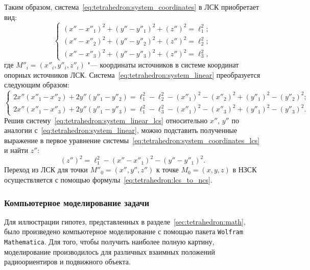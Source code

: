 \documentclass[../main.tex]{subfiles}
\begin{document}
Таким образом, система~\eqref{eq:tetrahedron:system_coordinates} в ЛСК приобретает вид:
\begin{equation}\label{eq:tetrahedron:system_coordinates_lcs}
  \begin{cases}
    \left(x'' - x''_1\right)^2 + \left(y'' - y''_1\right)^2 + \left(z''\right)^2 = \ell_1^2; \\
    \left(x'' - x''_2\right)^2 + \left(y'' - y''_2\right)^2 + \left(z''\right)^2 = \ell_2^2; \\
    \left(x'' - x''_3\right)^2 + \left(y'' - y''_3\right)^2 + \left(z''\right)^2 = \ell_3^2,
  \end{cases}
\end{equation}
где $M''_i = \left(x''_i, y''_i, z''_i\right)$ "--- координаты источников в системе координат опорных источников ЛСК. Система~\eqref{eq:tetrahedron:system_linear} преобразуется следующим образом:
\begin{equation}\label{eq:tetrahedron:system_linear_lcs}
  \begin{cases}
    2 x'' \left(x''_1 - x''_2\right) + 2 y'' \left(y''_1 - y''_2\right) = \ell_1^2 - \ell_2^2 - \left(x''_1\right)^2 - \left(x''_2\right)^2 + \left(y''_1\right)^2 - \left(y''_2\right)^2; \\
    2 x'' \left(x''_1 - x''_3\right) + 2 y'' \left(y''_1 - y''_3\right) = \ell_1^2 - \ell_3^2 - \left(x''_1\right)^2 - \left(x''_3\right)^2 + \left(y''_1\right)^2 - \left(y''_3\right)^2.
  \end{cases}
\end{equation}
Решив систему~\eqref{eq:tetrahedron:system_linear_lcs} относительно $x''$, $y''$ по аналогии с~\eqref{eq:tetrahedron:system_linear}, можно подставить полученные выражение в первое уравнение системы~\eqref{eq:tetrahedron:system_coordinates_lcs} и найти $z''$:
\begin{equation*}
  \left(z''\right)^2 = \ell_1^2 - \left(x'' - x''_1\right)^2 - \left(y'' - y''_1\right)^2.
\end{equation*}
Переход из ЛСК для точки $M''_0 = \left(x'', y'', z''\right)$ к точке $M_0 = \left(x, y, z\right)$ в НЗСК осуществляется с помощью формулы~\eqref{eq:tetrahedron:lcs_to_ncs}.

\subsubsection{Компьютерное моделирование задачи}
Для иллюстрации гипотез, представленных в разделе~\ref{sec:tetrahedron:math}, было произведено компьютерное моделирование с помощью пакета \texttt{Wolfram Mathematica}. Для того, чтобы получить наиболее полную картину, моделирование производилось для различных взаимных положений радиоориентиров и подвижного объекта.
\end{document}
